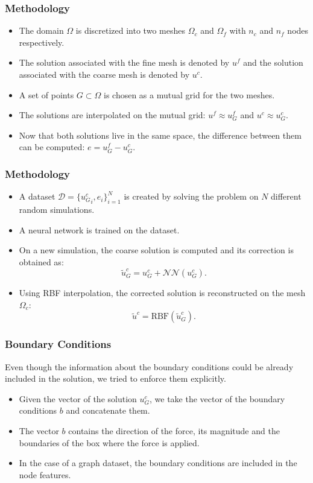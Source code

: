 \documentclass{beamer}
\begin{document}
\begin{frame}
\frametitle{Methodology}
\begin{itemize}
    \item The domain \( \Omega \) is discretized into two meshes \( \Omega_c \) and \( \Omega_f \) with \( n_c \) and \( n_f \) nodes respectively. 
    \item The solution associated with the fine mesh is denoted by \( u^f \) and the solution associated with the coarse mesh is denoted by \( u^c \).
    \item A set of points \(G \subset \Omega\) is chosen as a mutual grid for the two meshes.
    \item The solutions are interpolated on the mutual grid: \( u^f \approx u^f_G \) and \( u^c \approx u^c_G \).
    \item Now that both solutions live in the same space, the difference between them can be computed: \( e = u^f_G - u^c_G \).
\end{itemize}
\end{frame}

\begin{frame}
\frametitle{Methodology}
\begin{itemize}
    \item A dataset \(\mathcal{D} = \{{u_G^c}_i, e_i\}_{i=1}^N\) is created by solving the problem on \(N\) different random simulations.
    \item A neural network is trained on the dataset.
    \item On a new simulation, the coarse solution is computed and its correction is obtained as: 
    \[
        \tilde{u}_G^c = u_G^c + \mathcal{NN}(u_G^c).
    \]
    \item Using RBF interpolation, the corrected solution is reconstructed on the mesh \( \Omega_c \):
    \[
        \tilde{u}^c = \text{RBF}(\tilde{u}_G^c).
    \]
\end{itemize}
\end{frame}

\begin{frame}
\frametitle{Boundary Conditions}
Even though the information about the boundary conditions could be already included in the solution, we tried to enforce them explicitly.
\begin{itemize}
    \item Given the vector of the solution \( u_G^c \), we take the vector of the boundary conditions \( b \) and concatenate them.
    \item The vector \( b \) contains the direction of the force, its magnitude and the boundaries of the box where the force is applied.
    \item In the case of a graph dataset, the boundary conditions are included in the node features.
    \end{itemize}

\end{frame}
\end{document}
